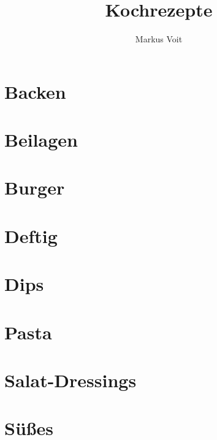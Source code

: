 \documentclass[
  DIV=11,%
  pagesize,%
  fontsize=11pt,%
  paper=a4,%
  numbers=noenddot,
]{scrartcl}
\title{Kochrezepte}
\author{Markus Voit}
\begin{document}
\maketitle

\tableofcontents
\clearpage

\section{Backen}
\newpage
\newpage

\section{Beilagen}
\newpage

\section{Burger}
\newpage
\newpage

\section{Deftig}
\newpage
\newpage
\newpage
\newpage

\section{Dips}
\newpage

\section{Pasta}
\newpage
\newpage

\section{Salat-Dressings}
\newpage

\section{Süßes}
\newpage
\newpage
\newpage
\newpage
\newpage
\newpage
\end{document}
